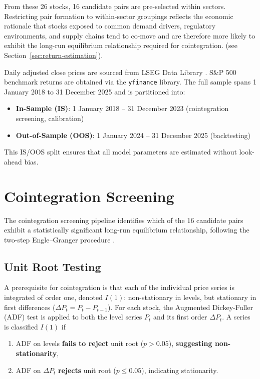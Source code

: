 \documentclass[a4paper]{report}
\begin{document}
From these 26 stocks, 16 candidate pairs are pre-selected within sectors. Restricting pair formation to within-sector groupings reflects the economic rationale that stocks exposed to common demand drivers, regulatory environments, and supply chains tend to co-move \cite{brealey1969} and are therefore more likely to exhibit the long-run equilibrium relationship required for cointegration. (see Section~\ref{sec:return-estimation}). 

Daily adjusted close prices are sourced from LSEG Data Library \cite{lsegdata2025}. S\&P 500 benchmark returns are obtained via the \texttt{yfinance} \cite{yfinance2026} library. The full sample spans 1 January 2018 to 31 December 2025 and is partitioned into: 

\begin{itemize} 
\item \textbf{In-Sample (IS)}: 1 January 2018 -- 31 December 2023 (cointegration screening, calibration) 
\item \textbf{Out-of-Sample (OOS)}: 1 January 2024 -- 31 December 2025 (backtesting) 
\end{itemize} 

This IS/OOS split ensures that all model parameters are estimated without look-ahead bias. 

\section{Cointegration Screening}
\label{sec:coint_screening}

The cointegration screening pipeline identifies which of the 16 candidate pairs exhibit a statistically significant long-run equilibrium relationship, following the two-step Engle--Granger procedure \cite{englegranger1987}.

\subsection{Unit Root Testing}

A prerequisite for cointegration is that each of the individual price series is integrated of order one, denoted $I(1)$: non-stationary in levels, but stationary in first differences ($\Delta P_t = P_t - P_{t-1}$). For each stock, the Augmented Dickey-Fuller (ADF) test is applied to both the level series $P_t$ and its first order $\Delta P_t$. A series is classified $I(1)$ if 

\begin{enumerate} 
    \item ADF on levels \textbf{fails to reject} unit root ($p > 0.05$), \textbf{suggesting non-stationarity}, 
    \item ADF on $\Delta P_t$ \textbf{rejects} unit root ($p \leq 0.05$), indicating stationarity. 
\end{enumerate} 
\end{document}
